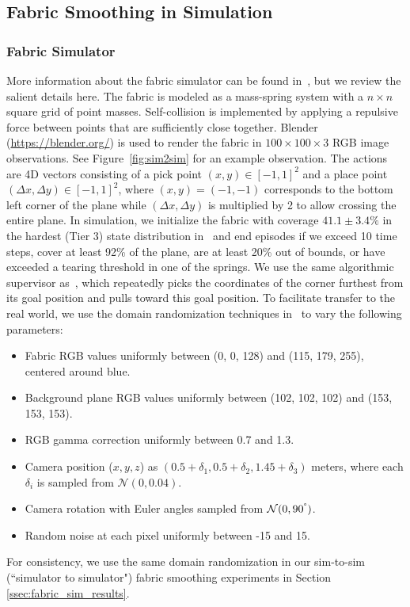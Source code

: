 \subsection{Fabric Smoothing in Simulation}

\subsubsection{Fabric Simulator}\label{ssec:fabricsim}

More information about the fabric simulator can be found in~\citet{seita_fabrics_2020}, but we review the salient details here. The fabric is modeled as a mass-spring system with a $n \times n$ square grid of point masses.
Self-collision is implemented by applying a repulsive force between points that are sufficiently close together. Blender (\url{https://blender.org/}) is used to render the fabric in $100 \times 100 \times 3$ RGB image observations. See Figure~\ref{fig:sim2sim} for an example observation. The actions are 4D vectors consisting of a pick point $(x, y) \in [-1,1]^2$ and a place point $(\Delta x, \Delta y) \in [-1,1]^2$, where $(x,y) = (-1,-1)$ corresponds to the bottom left corner of the plane while $(\Delta x, \Delta y)$ is multiplied by 2 to allow crossing the entire plane. In simulation, we initialize the fabric with coverage $41.1 \pm 3.4\%$ in the hardest (Tier 3) state distribution in~\cite{seita_fabrics_2020} and end episodes if we exceed 10 time steps, cover at least 92\% of the plane, are at least 20\% out of bounds, or have exceeded a tearing threshold in one of the springs. We use the same algorithmic supervisor as~\cite{seita_fabrics_2020}, which repeatedly picks the coordinates of the corner furthest from its goal position and pulls toward this goal position. To facilitate transfer to the real world, we use the domain randomization techniques in~\cite{seita_fabrics_2020} to vary the following parameters: 
\begin{itemize}
    \item Fabric RGB values uniformly between (0, 0, 128) and (115, 179, 255), centered around blue.
    \item Background plane RGB values uniformly between (102, 102, 102) and (153, 153, 153).
    \item RGB gamma correction uniformly between 0.7 and 1.3.
    \item Camera position ($x, y, z$) as $(0.5+\delta_1, 0.5+\delta_2, 1.45+\delta_3)$ meters, where each $\delta_i$ is sampled from $\mathcal{N}(0, 0.04)$.
    \item Camera rotation with Euler angles sampled from $\mathcal{N}(0, 90^{\degree} )$.
    \item Random noise at each pixel uniformly between -15 and 15.
\end{itemize}
For consistency, we use the same domain randomization in our sim-to-sim (``simulator to simulator") fabric smoothing experiments in Section \ref{ssec:fabric_sim_results}.

